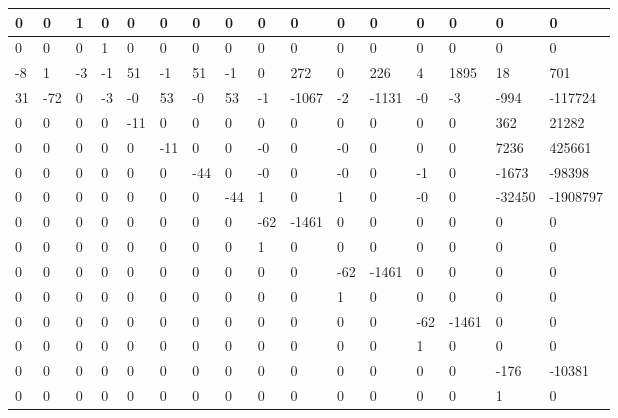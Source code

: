 \begin{tabular}{|l|l|l|l|l|l|l|l|l|l|l|l|l|l|l|l|}
\hline
0&0&1&0&0&0&0&0&0&0&0&0&0&0&0&0\\\hline
0&0&0&1&0&0&0&0&0&0&0&0&0&0&0&0\\\hline
-8&1&-3&-1&51&-1&51&-1&0&272&0&226&4&1895&18&701\\\hline
31&-72&0&-3&-0&53&-0&53&-1&-1067&-2&-1131&-0&-3&-994&-117724\\\hline
0&0&0&0&-11&0&0&0&0&0&0&0&0&0&362&21282\\\hline
0&0&0&0&0&-11&0&0&-0&0&-0&0&0&0&7236&425661\\\hline
0&0&0&0&0&0&-44&0&-0&0&-0&0&-1&0&-1673&-98398\\\hline
0&0&0&0&0&0&0&-44&1&0&1&0&-0&0&-32450&-1908797\\\hline
0&0&0&0&0&0&0&0&-62&-1461&0&0&0&0&0&0\\\hline
0&0&0&0&0&0&0&0&1&0&0&0&0&0&0&0\\\hline
0&0&0&0&0&0&0&0&0&0&-62&-1461&0&0&0&0\\\hline
0&0&0&0&0&0&0&0&0&0&1&0&0&0&0&0\\\hline
0&0&0&0&0&0&0&0&0&0&0&0&-62&-1461&0&0\\\hline
0&0&0&0&0&0&0&0&0&0&0&0&1&0&0&0\\\hline
0&0&0&0&0&0&0&0&0&0&0&0&0&0&-176&-10381\\\hline
0&0&0&0&0&0&0&0&0&0&0&0&0&0&1&0\\\hline
\end{tabular}
